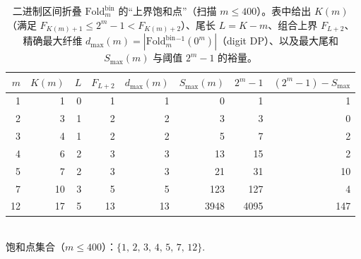 \begin{table}[H]
\centering
\scriptsize
\setlength{\tabcolsep}{6pt}
\caption{二进制区间折叠 $\mathrm{Fold}^{\mathrm{bin}}_m$ 的“上界饱和点”（扫描 $m\le 400$）。表中给出 $K(m)$（满足 $F_{K(m)+1}\le 2^m-1 < F_{K(m)+2}$）、尾长 $L=K-m$、组合上界 $F_{L+2}$、精确最大纤维 $d_{\max}(m)=|\mathrm{Fold}^{\mathrm{bin}}_m{}^{-1}(0^m)|$（digit DP）、以及最大尾和 $S_{\max}(m)$ 与阈值 $2^m-1$ 的裕量。}
\label{tab:fold_binary_saturation_points}
\begin{tabular}{rrrrrrrr}
\toprule
$m$ & $K(m)$ & $L$ & $F_{L+2}$ & $d_{\max}(m)$ & $S_{\max}(m)$ & $2^m-1$ & $(2^m-1)-S_{\max}$\\
\midrule
1 & 1 & 0 & 1 & 1 & 0 & 1 & 1\\
2 & 3 & 1 & 2 & 2 & 3 & 3 & 0\\
3 & 4 & 1 & 2 & 2 & 5 & 7 & 2\\
4 & 6 & 2 & 3 & 3 & 13 & 15 & 2\\
5 & 7 & 2 & 3 & 3 & 21 & 31 & 10\\
7 & 10 & 3 & 5 & 5 & 123 & 127 & 4\\
12 & 17 & 5 & 13 & 13 & 3948 & 4095 & 147\\
\bottomrule
\end{tabular}
\vspace{4pt}
\\饱和点集合（$m\le 400$）：$\{ 1,\,2,\,3,\,4,\,5,\,7,\,12 \}$.
\end{table}
